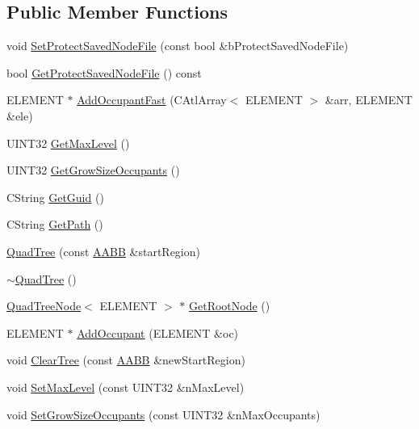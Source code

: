 \subsection*{Public Member Functions}
\begin{DoxyCompactItemize}
\item 
void \hyperlink{class_quad_tree_af1e6c0795e08f7a19976c25dec990fb3}{Set\+Protect\+Saved\+Node\+File} (const bool \&b\+Protect\+Saved\+Node\+File)
\item 
bool \hyperlink{class_quad_tree_a193ff0f8623fae69018a5544e830d05e}{Get\+Protect\+Saved\+Node\+File} () const 
\item 
E\+L\+E\+M\+E\+N\+T $\ast$ \hyperlink{class_quad_tree_a6fab68bcd84ac256be5b2f560aebbc56}{Add\+Occupant\+Fast} (C\+Atl\+Array$<$ E\+L\+E\+M\+E\+N\+T $>$ \&arr, E\+L\+E\+M\+E\+N\+T \&ele)
\item 
U\+I\+N\+T32 \hyperlink{class_quad_tree_a8731a8924a9956bb170996f1ec24304c}{Get\+Max\+Level} ()
\item 
U\+I\+N\+T32 \hyperlink{class_quad_tree_a904b0247c93b8df0459165dd50b78ef8}{Get\+Grow\+Size\+Occupants} ()
\item 
C\+String \hyperlink{class_quad_tree_a77c8f05fe5f0971a17a93f83e9763916}{Get\+Guid} ()
\item 
C\+String \hyperlink{class_quad_tree_a5a13129cfe2810e7a05dff90c116ccb8}{Get\+Path} ()
\item 
\hyperlink{class_quad_tree_a48bd2929c0363c07358fbb82e06343c4}{Quad\+Tree} (const \hyperlink{struct_a_a_b_b}{A\+A\+B\+B} \&start\+Region)
\item 
\hyperlink{class_quad_tree_a61daf739925b692a74777d4380f75670}{$\sim$\+Quad\+Tree} ()
\item 
\hyperlink{class_quad_tree_node}{Quad\+Tree\+Node}$<$ E\+L\+E\+M\+E\+N\+T $>$ $\ast$ \hyperlink{class_quad_tree_af6df68e0e7aa43c1e4b0d79ffa34ee06}{Get\+Root\+Node} ()
\item 
E\+L\+E\+M\+E\+N\+T $\ast$ \hyperlink{class_quad_tree_add9726a45b0318dfb6ba7e1b9c5c7f35}{Add\+Occupant} (E\+L\+E\+M\+E\+N\+T \&oc)
\item 
void \hyperlink{class_quad_tree_a29cfab3aa52dc04dc473e870c9eb3d7f}{Clear\+Tree} (const \hyperlink{struct_a_a_b_b}{A\+A\+B\+B} \&new\+Start\+Region)
\item 
void \hyperlink{class_quad_tree_aed68288badbac45aaa81020636ae3d16}{Set\+Max\+Level} (const U\+I\+N\+T32 \&n\+Max\+Level)
\item 
void \hyperlink{class_quad_tree_a9a786b7db2a3927db741987fe41c61e8}{Set\+Grow\+Size\+Occupants} (const U\+I\+N\+T32 \&n\+Max\+Occupants)

\end{DoxyCompactItemize}
